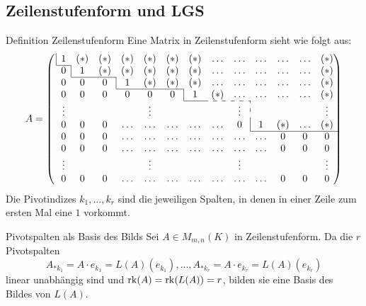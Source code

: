 \documentclass[main.tex]{subfiles}
\begin{document}
\subsection*{Zeilenstufenform und LGS}
\begin{karte}{Definition Zeilenstufenform}
    Eine Matrix in Zeilenstufenform sieht wie folgt aus:
    \begin{equation*}
        A =
        \left(\mkern3mu
          \begin{array}{*{13}c}
            \multicolumn{1}{|c}{1} & (*) & (*) & (*) & (*) & (*) & (*) & \ldots & \ldots & \ldots & \ldots & \ldots & (*) \\
            \cline{1-1}
            0 & \multicolumn{1}{|c}{1} & (*) & (*) & (*) & (*) & (*)  & \ldots & \ldots & \ldots & \ldots & \ldots & (*) \\
            \cline{2-3}
            0 & 0 & 0 & \multicolumn{1}{|c}{1} & (*) & (*) & (*) & \ldots & \ldots & \ldots & \ldots & \ldots & (*)\\
            \cline{4-6}
            0 & 0 & 0 & 0 & 0 & 0 & \multicolumn{1}{|c}{1} & (*) & \ldots & \ldots & \ldots & \ldots & (*) \\
            \cline{7-7}\cdashline{8-9}
            \vdots & & & & \vdots & & & & \vdots & \multicolumn{1}{:c}{} & & & \vdots \\
            0 & 0 & 0 & \ldots & \ldots & \ldots & \ldots & \ldots & 0 & \multicolumn{1}{|c}{1} & (*) & \ldots & (*) \\
            \cline{10-13}
            0 & 0 & 0 & \ldots  & \ldots & \ldots & \ldots & \ldots & \ldots & \ldots & 0 & 0 & 0 \\
            0 & 0 & 0 & \ldots  & \ldots & \ldots & \ldots & \ldots & \ldots & \ldots & 0 & 0 & 0 \\
            \vdots & & & & \vdots & & & & \vdots & & & & \vdots \\
            0 & 0 & 0 & \ldots  & \ldots & \ldots & \ldots & \ldots & \ldots & \ldots & 0 & 0 & 0
          \end{array}
         \hskip-\arraycolsep\right)
      \end{equation*}
      Die Pivotindizes \( k_1,\ldots, k_r \) sind die jeweiligen Spalten, 
      in denen in einer Zeile zum ersten Mal eine \( 1 \) vorkommt.
\end{karte}
\begin{karte}{Pivotspalten als Basis des Bilds}
    Sei \( A \in M_{m,n}(K) \) in Zeilenstufenform.
    Da die \(r\) Pivotspalten 
    \[ A_{*k_1} = A \cdot e_{k_1} = L(A)(e_{k_1}), \ldots, 
    A_{*k_r} = A \cdot e_{k_r} = L(A)(e_{k_r}) \]
    linear unabhängig sind und \( \operatorname{rk}(A) = \operatorname{rk}(L(A)) = r\), 
    bilden sie eine Basis des Bildes von \( L(A)\).
\end{karte}
\end{document}
